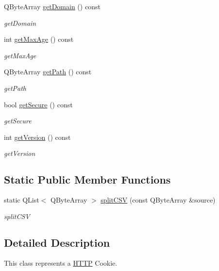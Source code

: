\begin{DoxyCompactItemize}
Q\+Byte\+Array \hyperlink{class_http_cookie_aeaafc0d8651b07c94d1ed247a4e23dff}{get\+Domain} () const
\begin{DoxyCompactList}\small\item\em get\+Domain \end{DoxyCompactList}\item 
int \hyperlink{class_http_cookie_a3a55c75cb4220b303cbed4713f538995}{get\+Max\+Age} () const
\begin{DoxyCompactList}\small\item\em get\+Max\+Age \end{DoxyCompactList}\item 
Q\+Byte\+Array \hyperlink{class_http_cookie_a3796862a6c50124eb5c987dd617a097c}{get\+Path} () const
\begin{DoxyCompactList}\small\item\em get\+Path \end{DoxyCompactList}\item 
bool \hyperlink{class_http_cookie_a270cd78805263b5ed80f4e3354caf4e4}{get\+Secure} () const
\begin{DoxyCompactList}\small\item\em get\+Secure \end{DoxyCompactList}\item 
int \hyperlink{class_http_cookie_ac390582430915aa5570c6a397f20210d}{get\+Version} () const
\begin{DoxyCompactList}\small\item\em get\+Version \end{DoxyCompactList}\end{DoxyCompactItemize}
\subsection*{Static Public Member Functions}
\begin{DoxyCompactItemize}
\item 
static Q\+List$<$ Q\+Byte\+Array $>$ \hyperlink{class_http_cookie_a3f086e32413e23fdab53ffefa70b8b0e}{split\+C\+SV} (const Q\+Byte\+Array \&source)
\begin{DoxyCompactList}\small\item\em split\+C\+SV \end{DoxyCompactList}\end{DoxyCompactItemize}


\subsection{Detailed Description}
This class represents a \hyperlink{namespace_h_t_t_p}{H\+T\+TP} Cookie. 


